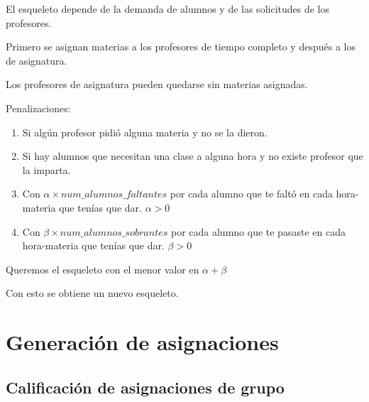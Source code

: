El esqueleto depende de la demanda de alumnos y de las solicitudes de los profesores.

Primero se asignan materias a los profesores de tiempo completo y después a los de asignatura.

Los profesores de asignatura pueden quedarse sin materias asignadas.

Penalizaciones:

\begin{enumerate}
\item Si algún profesor pidió alguna materia y no se la dieron.

\item Si hay alumnos que necesitan una clase a alguna hora y no existe profesor que la imparta.

\item Con $\alpha \times num\_alumnos\_faltantes$ por cada alumno que te faltó en cada hora-materia que tenías que dar. $\alpha > 0$

\item Con $\beta \times num\_alumnos\_sobrantes$ por cada alumno que te pasaste en cada hora-materia que tenías que dar. $\beta > 0$

\end{enumerate}

Queremos el esqueleto con el menor valor en $\alpha + \beta$

Con esto se obtiene un nuevo esqueleto.


\section{Generación de asignaciones}

\subsection{Calificación de asignaciones de grupo}


%
%
%
%





